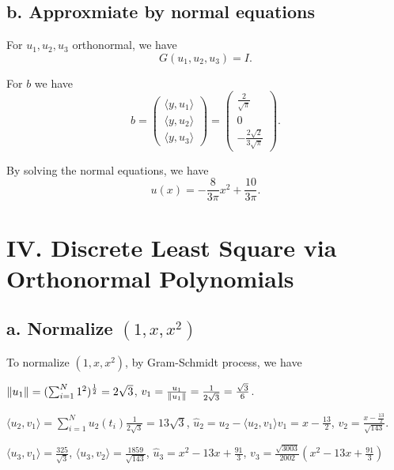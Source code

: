 \documentclass[a4paper]{article}
\begin{document}
\subsection*{b. Approxmiate by normal equations}

For $u_1, u_2, u_3$ orthonormal, we have
\begin{equation}
    G(u_1, u_2, u_3) = I. 
\end{equation}

For $b$ we have
\begin{equation}
    b = \begin{pmatrix} \langle y, u_1 \rangle \\ \langle y, u_2 \rangle \\ \langle y, u_3 \rangle \end{pmatrix} = \begin{pmatrix} \frac{2}{\sqrt{\pi}} \\ 0 \\ -\frac{2 \sqrt{2}}{3 \sqrt{\pi}} \end{pmatrix}.
\end{equation}

By solving the normal equations, we have
\begin{equation}
    u(x) = -\frac{8}{3 \pi} x^2 + \frac{10}{3 \pi}. 
\end{equation}


\section*{IV. Discrete Least Square via Orthonormal Polynomials}

\subsection*{a. Normalize $(1, x, x^2)$ }

To normalize $(1, x, x^2)$, by Gram-Schmidt process, we have

$\norm{u_1} = (\sum_{i=1}^{N} 1^2) ^{\frac{1}{2}} = 2 \sqrt{3}$, $v_1 = \frac{u_1}{\norm{u_1}} = \frac{1}{2 \sqrt{3}} = \frac{\sqrt{3}}{6}$.

$\langle u_2, v_1 \rangle = \sum_{i=1}^{N} u_2(t_i) \frac{1}{2 \sqrt{3}} = 13 \sqrt{3}$, $\hat{u}_2 = u_2 - \langle u_2, v_1 \rangle v_1 = x - \frac{13}{2}$, $v_2 = \frac{x - \frac{13}{2}}{\sqrt{143}}$. 

$\langle u_3, v_1 \rangle = \frac{325}{\sqrt{3}}$, $\langle u_3, v_2 \rangle = \frac{1859}{\sqrt{143}}$, $\hat{u}_3 = x^2 - 13 x + \frac{91}{3}$, $v_3 = \frac{\sqrt{3003}}{2002}(x^2 - 13 x + \frac{91}{3}) $
\end{document}
